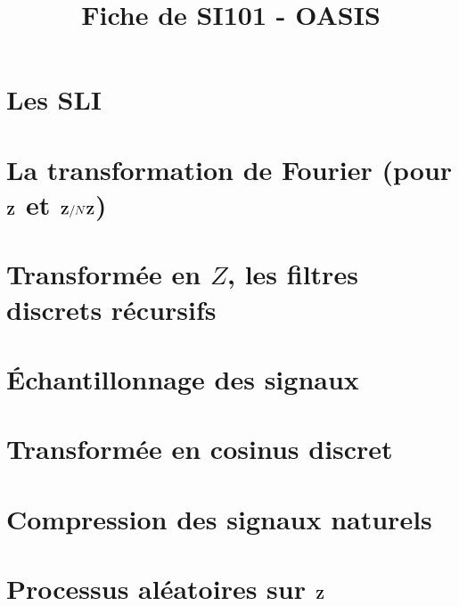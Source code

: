 \documentclass[a4paper,9pt]{article}
\title{\vspace{-1.2cm} Fiche de SI101 - OASIS}
\date{}
\theoremstyle{persoth}%
\theoremstyle{persodef}
\theoremstyle{remark}
\begin{document}
\maketitle

\vspace{-1.5cm}

\section{Les SLI}

	

\section{La transformation de Fourier (pour $\mathbf{Z}$ et $\mathbf{Z} / N\mathbf{Z}$)}

	

\section{Transformée en $Z$, les filtres discrets récursifs}

	

\section{Échantillonnage des signaux}

	

\section{Transformée en cosinus discret}

	

\section{Compression des signaux naturels}

	

\section{Processus aléatoires sur $\mathbf{Z}$}

	


%	
\end{document}
